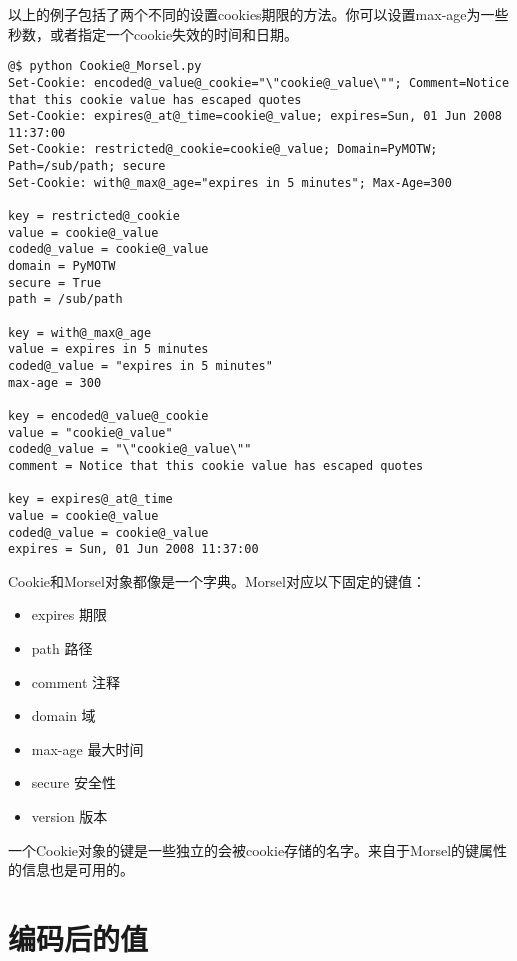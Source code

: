 \documentclass[a4paper,10pt,english]{manual}
\begin{document}
以上的例子包括了两个不同的设置cookies期限的方法。你可以设置max-age为一些秒数，或者指定一个cookie失效的时间和日期。

\begin{Verbatim}[commandchars=@\[\]]
@$ python Cookie@_Morsel.py
Set-Cookie: encoded@_value@_cookie="\"cookie@_value\""; Comment=Notice that this cookie value has escaped quotes
Set-Cookie: expires@_at@_time=cookie@_value; expires=Sun, 01 Jun 2008 11:37:00
Set-Cookie: restricted@_cookie=cookie@_value; Domain=PyMOTW; Path=/sub/path; secure
Set-Cookie: with@_max@_age="expires in 5 minutes"; Max-Age=300

key = restricted@_cookie
value = cookie@_value
coded@_value = cookie@_value
domain = PyMOTW
secure = True
path = /sub/path

key = with@_max@_age
value = expires in 5 minutes
coded@_value = "expires in 5 minutes"
max-age = 300

key = encoded@_value@_cookie
value = "cookie@_value"
coded@_value = "\"cookie@_value\""
comment = Notice that this cookie value has escaped quotes

key = expires@_at@_time
value = cookie@_value
coded@_value = cookie@_value
expires = Sun, 01 Jun 2008 11:37:00
\end{Verbatim}

Cookie和Morsel对象都像是一个字典。Morsel对应以下固定的键值：
\begin{itemize}
\item {} 
expires 期限

\item {} 
path 路径

\item {} 
comment 注释

\item {} 
domain 域

\item {} 
max-age 最大时间

\item {} 
secure 安全性

\item {} 
version 版本

\end{itemize}

一个Cookie对象的键是一些独立的会被cookie存储的名字。来自于Morsel的键属性的信息也是可用的。


\section{编码后的值}
\end{document}
